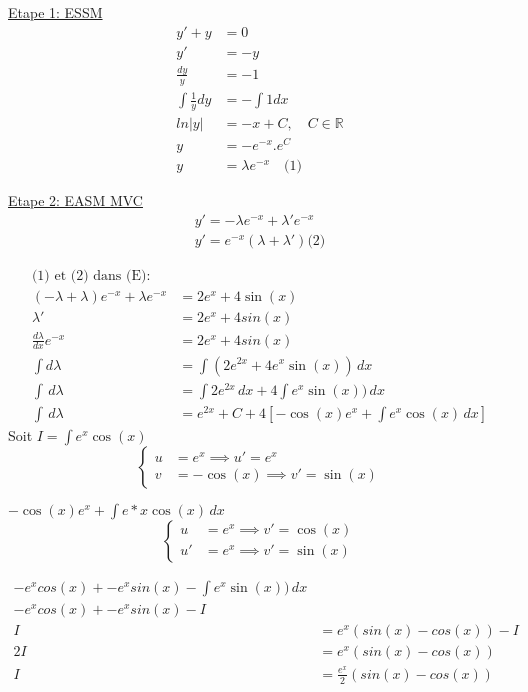 \underline{Etape 1: ESSM} \\
\begin{align*}
	y' + y &= 0 \\
	y' &= -y \\
	\frac{dy}{y} &= -1 \\
	\int \frac{1}{y} dy &= - \int 1 dx \\
	ln \lvert y \lvert &= -x + C, \quad C \in \mathbb{R} \\
	y &= -e^{-x}.e^C \\
	y &= \lambda e^{-x} \quad \text{(1)}
\end{align*}

\underline{Etape 2: EASM MVC} \\
\begin{align*}
	y' = -\lambda e^{-x}	 + \lambda'e^{-x} \\
	y' = e^{-x} (\lambda + \lambda') \text{(2)}
\end{align*}

\begin{align*}
	\text{(1) et (2) dans (E):} \\
	(-\lambda + \lambda)e^{-x} + \lambda e^{-x} &= 2e^x + 4\sin(x) \\
	\lambda' &= 2e^x + 4sin(x) \\
    \frac{d\lambda}{dx}e^{-x} &= 2e^x + 4sin(x) \\
    \int d\lambda &= \int (2e^{2x} + 4e^x \sin(x)) \, dx \\
    \int \, d\lambda &= \int 2e^{2x} \, dx + 4\int e^x \sin(x)) \, dx \\
    \int \, d\lambda &= e^{2x} + C + 4 [-\cos(x)e^x + \int e^x\cos(x)\, dx]
\end{align*}
Soit $I = \int e^x\cos(x)\ $ \\
\[
\left\{
\begin{aligned}
    u &= e^x \implies u'= e^x  \\
    v &= -\cos(x) \implies v' = \sin(x)
\end{aligned}
\right.
\]

$-\cos(x)e^x + \int e*x\cos(x)\, dx$
\[
\left\{
\begin{aligned}
    u &= e^x \implies v'= \cos(x)  \\
    u' &= e^x \implies v' = \sin(x)
\end{aligned}
\right.
\]

\begin{align*}
    -e^xcos(x) + -e^xsin(x) - \int e^x \sin(x)) \, dx \\
    -e^xcos(x) + -e^xsin(x) - I \\
    I &= e^x(sin(x) - cos(x)) - I \\
    2I &= e^x(sin(x) - cos(x)) \\
    I &= \frac{e^x}{2}(sin(x) - cos(x)) 
\end{align*}

